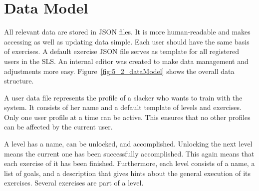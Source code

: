 \section{Data Model }\label{5_2_dataModel}
All relevant data are stored in JSON files. It is more human-readable and makes accessing as well as updating data simple. Each user should have the same basis of exercises. A default exercise JSON file serves as template for all registered users in the SLS. An internal editor was created to make data management and adjustments more easy. Figure~\ref{fig:5_2_dataModel} shows the overall data structure.

A user data file represents the profile of a slacker who wants to train with the system.
It consists of her name and a default template of levels and exercises.
Only one user profile at a time can be active.
This ensures that no other profiles can be affected by the current user.

A level has a name, can be unlocked, and accomplished. Unlocking the next level means the current one has been successfully accomplished. This again means that each exercise of it has been finished. Furthermore, each level consists of a name, a list of goals, and a description that gives hints about the general execution of its exercises.
Several exercises are part of a level.

